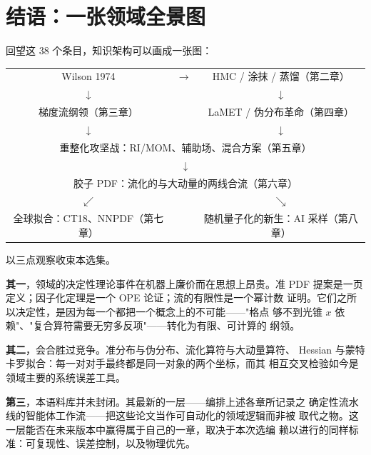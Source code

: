 \chapter*{结语：一张领域全景图}


回望这 38 个条目，知识架构可以画成一张图：

\begin{center}
\begin{tabular}{ccc}
Wilson 1974 & $\longrightarrow$ & HMC / 涂抹 / 蒸馏（第二章）\\[2pt]
$\downarrow$ & & $\downarrow$\\[2pt]
梯度流纲领（第三章） & & LaMET / 伪分布革命（第四章）\\[2pt]
$\downarrow$ & & $\downarrow$\\
\multicolumn{3}{c}{重整化攻坚战：RI/MOM、辅助场、混合方案（第五章）}\\[-1pt]
\multicolumn{3}{c}{$\downarrow$}\\[-1pt]
\multicolumn{3}{c}{胶子 PDF：流化的与大动量的两线合流（第六章）}\\[2pt]
$\swarrow$ & & $\searrow$\\[2pt]
全球拟合：CT18、NNPDF（第七章） & & 随机量子化的新生：AI 采样（第八章）
\end{tabular}
\end{center}

以三点观察收束本选集。

\textbf{其一}，领域的决定性理论事件在机器上廉价而在思想上昂贵。准 PDF
提案是一页定义；因子化定理是一个 OPE 论证；流的有限性是一个幂计数
证明。它们之所以决定性，是因为每一个都把一个概念上的不可能——"格点
够不到光锥 $x$ 依赖"、"复合算符需要无穷多反项"——转化为有限、可计算的
纲领。

\textbf{其二}，会合胜过竞争。准分布与伪分布、流化算符与大动量算符、
Hessian 与蒙特卡罗拟合：每一对对手最终都是同一对象的两个坐标，而其
相互交叉检验如今是领域主要的系统误差工具。

\textbf{第三}，本语料库并未封闭。其最新的一层——编排上述各章所记录之
确定性流水线的智能体工作流——把这些论文当作可自动化的领域逻辑而非被
取代之物。这一层能否在未来版本中赢得属于自己的一章，取决于本次选编
赖以进行的同样标准：可复现性、误差控制，以及物理优先。

